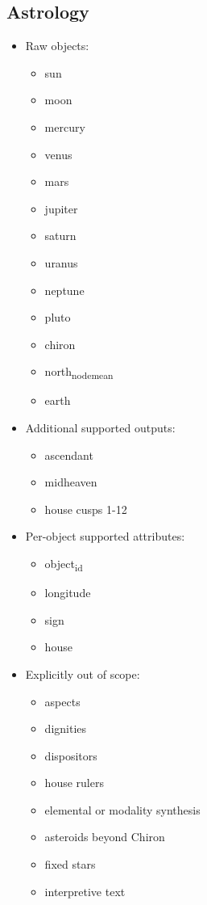 \documentclass[11pt]{article}
\begin{document}
\subsection{Astrology}
\label{sec:orgfc2dc9d}
\begin{itemize}
\item Raw objects:
\begin{itemize}
\item sun
\item moon
\item mercury
\item venus
\item mars
\item jupiter
\item saturn
\item uranus
\item neptune
\item pluto
\item chiron
\item north\textsubscript{node}\textsubscript{mean}
\item earth
\end{itemize}
\item Additional supported outputs:
\begin{itemize}
\item ascendant
\item midheaven
\item house cusps 1-12
\end{itemize}
\item Per-object supported attributes:
\begin{itemize}
\item object\textsubscript{id}
\item longitude
\item sign
\item house
\end{itemize}
\item Explicitly out of scope:
\begin{itemize}
\item aspects
\item dignities
\item dispositors
\item house rulers
\item elemental or modality synthesis
\item asteroids beyond Chiron
\item fixed stars
\item interpretive text
\end{itemize}
\end{itemize}
\end{document}
